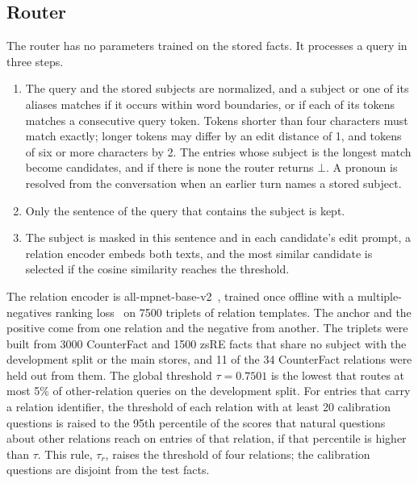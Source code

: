\documentclass[journal,10pt]{IEEEtran}
\begin{document}
\subsection{Router}
\label{sec:router}
The router has no parameters trained on the stored facts. It processes a query in three steps.
\begin{enumerate}
\item The query and the stored subjects are normalized, and a subject or one of its aliases matches if it
occurs within word boundaries, or if each of its tokens matches a consecutive query token. Tokens shorter
than four characters must match exactly; longer tokens may differ by an edit distance of 1, and tokens of
six or more characters by 2. The entries whose subject is the longest match become candidates, and if there
is none the router returns $\bot$. A pronoun is resolved from the conversation when an earlier turn names a
stored subject.
\item Only the sentence of the query that contains the subject is kept.
\item The subject is masked in this sentence and in each candidate's edit prompt, a relation encoder embeds
both texts, and the most similar candidate is selected if the cosine similarity reaches the threshold.
\end{enumerate}
The relation encoder is all-mpnet-base-v2~\cite{song2020mpnet,reimers2019sbert}, trained once offline with
a multiple-negatives ranking loss~\cite{henderson2017efficient} on 7500 triplets of relation templates. The
anchor and the positive come from one relation and the negative from another. The triplets were built from
3000 CounterFact and 1500 zsRE facts that share no subject with the development split or the main stores,
and 11 of the 34 CounterFact relations were held out from them. The global threshold $\tau=0.7501$ is the
lowest that routes at most 5\% of other-relation queries on the development split. For entries that carry
a relation identifier, the threshold of each relation with at least 20 calibration questions is raised to
the 95th percentile of the scores that natural questions about other relations reach on entries of that
relation, if that percentile is higher than $\tau$. This rule, $\tau_r$, raises the threshold of four
relations; the calibration questions are disjoint from the test facts.
\end{document}
